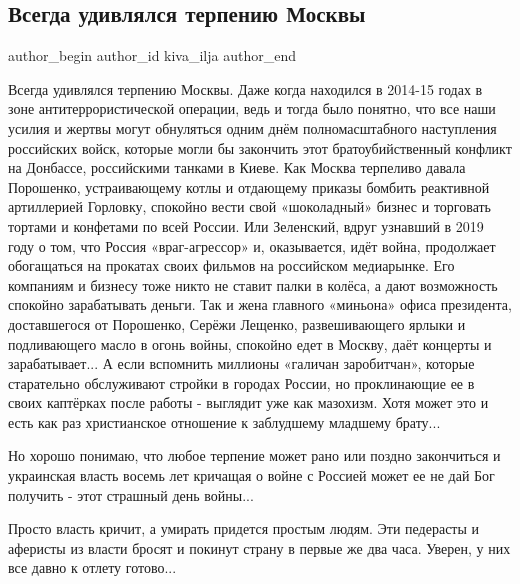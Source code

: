  
 
 
 
 
 
\subsection{Всегда удивлялся терпению Москвы}
\label{sec:07_12_2021.fb.kiva_ilja.1.terpenie_moskva}
 
\ifcmt
 author_begin
   author_id kiva_ilja
 author_end
\fi

Всегда удивлялся терпению Москвы. Даже когда находился в 2014-15 годах в зоне
антитеррористической операции, ведь и тогда было понятно, что все наши усилия и
жертвы могут обнуляться одним днём полномасштабного наступления российских
войск, которые могли бы закончить этот братоубийственный конфликт на Донбассе,
российскими танками в Киеве. Как Москва терпеливо давала Порошенко,
устраивающему котлы и отдающему  приказы бомбить реактивной артиллерией
Горловку, спокойно вести свой «шоколадный» бизнес и  торговать тортами и
конфетами  по всей России. Или Зеленский, вдруг узнавший в 2019 году о том, что
Россия «враг-агрессор» и, оказывается, идёт война, продолжает обогащаться на
прокатах своих фильмов на российском медиарынке.  Его компаниям и бизнесу тоже
никто не ставит палки в колёса, а дают возможность спокойно зарабатывать
деньги. Так и жена главного «миньона» офиса президента, доставшегося от
Порошенко, Серёжи Лещенко, развешивающего ярлыки и подливающего масло в огонь
войны, спокойно едет в Москву, даёт концерты и зарабатывает... А если вспомнить
миллионы «галичан заробитчан», которые старательно обслуживают стройки в
городах России, но проклинающие ее в своих каптёрках после работы - выглядит
уже как мазохизм. Хотя может это и есть как раз христианское отношение к
заблудшему младшему брату... 

Но хорошо понимаю, что любое терпение может рано или поздно закончиться и
украинская власть восемь лет кричащая о войне с Россией может ее не дай Бог
получить - этот страшный день войны... 

Просто власть кричит, а умирать придется простым людям. Эти педерасты и
аферисты из власти бросят и покинут  страну в первые же два часа. Уверен,  у
них все давно к отлету готово...

